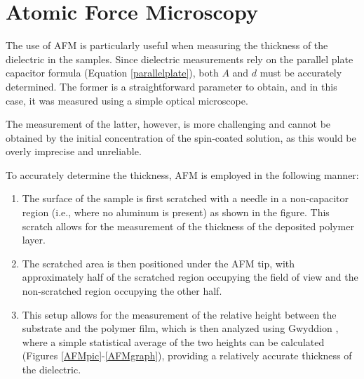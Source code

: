 
\section{Atomic Force Microscopy}

The use of \ac{AFM} is particularly useful when measuring the thickness of the dielectric in the samples.
%
%
Since dielectric measurements rely on the parallel plate capacitor formula (Equation \ref{parallelplate}), both $A$ and $d$ must be accurately determined. The former is a straightforward parameter to obtain, and in this case, it was measured using a simple optical microscope. %


The measurement of the latter, however, is more challenging and cannot be obtained by the initial concentration of the spin-coated solution, as this would be overly imprecise and unreliable.

To accurately determine the thickness, AFM is employed in the following manner:
\begin{enumerate}
    \item The surface of the sample is first scratched with a needle in a non-capacitor region (i.e., where no aluminum is present) as shown in the figure. This scratch allows for the measurement of the thickness of the deposited polymer layer. %
    \item The scratched area is then positioned under the AFM tip, with approximately half of the scratched region occupying the field of view and the non-scratched region occupying the other half.
    \item This setup allows for the measurement of the relative height between the substrate and the polymer film, which is then analyzed using Gwyddion \cite{gwyddion},
	    where a simple statistical average of the two heights can be calculated (Figures \ref{AFMpic}-\ref{AFMgraph}), providing a relatively accurate thickness of the dielectric.
\end{enumerate}

